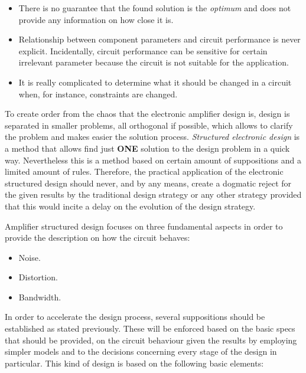 \documentclass[twocolumn]{IEEEtran}
\begin{document}
\begin{itemize}
\item There is no guarantee that the found solution is the {\it optimum} and does not provide any information on how close it is.
\item Relationship between component parameters and circuit performance is never explicit. Incidentally, circuit performance can be sensitive for certain irrelevant parameter because the circuit is not suitable for the application.
\item It is really complicated to determine what it should be changed in a circuit when, for instance, constraints are changed.
\end{itemize}

To create order from the chaos that the electronic amplifier design is, design is separated in smaller problems, all orthogonal if possible, which allows to clarify the problem and makes easier the solution process. {\it Structured electronic design} \cite{verhoeven,nordholt} is a method that allows find just {\bf ONE} solution to the design problem in a quick way. Nevertheless this is a method based on certain amount of suppositions and a limited amount of rules. Therefore, the practical application of the electronic structured design should never, and by any means, create a dogmatic reject for the given results by the traditional design strategy or any other strategy provided that this would incite a delay on the evolution of the design strategy.

Amplifier structured design focuses on three fundamental aspects in order to provide the description on how the circuit behaves:

\begin{itemize}
\item Noise.
\item Distortion.
\item Bandwidth.
\end{itemize}

In order to accelerate the design process, several suppositions should be established as stated previously. These will be enforced based on the basic specs that should be provided, on the circuit behaviour given the results by employing simpler models and to the decisions concerning \mbox{every} stage of the design in particular. This kind of design is based on the following basic elements:
\end{document}
